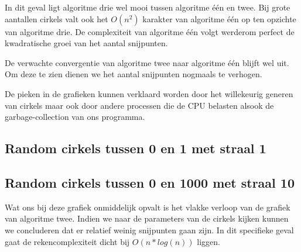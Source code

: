 \documentclass[11pt,a4paper]{article}
\begin{document}
In dit geval ligt algoritme drie wel mooi tussen algoritme \'e\'en en twee. Bij grote aantallen cirkels valt ook het $O(n^{2})$ karakter van algoritme \'e\'en op ten opzichte van algoritme drie. De complexiteit van algoritme \'e\'en volgt werderom perfect de kwadratische groei van het aantal snijpunten.

De verwachte convergentie van algoritme twee naar algoritme \'e\'en blijft wel uit. Om deze te zien dienen we het aantal snijpunten nogmaals te verhogen.

De pieken in de grafieken kunnen verklaard worden door het willekeurig generen van cirkels maar ook door andere processen die de CPU belasten alsook de garbage-collection van ons programma. 

\subsection{Random cirkels tussen 0 en 1 met straal 1}

\subsection{Random cirkels tussen 0 en 1000 met straal 10}

Wat ons bij deze grafiek onmiddelijk opvalt is het vlakke verloop van de grafiek van algoritme twee. Indien we naar de parameters van de cirkels kijken kunnen we concluderen dat er relatief weinig snijpunten gaan zijn. In dit specifieke geval gaat de rekencomplexiteit dicht bij $O(n*log(n))$ liggen.
\end{document}
